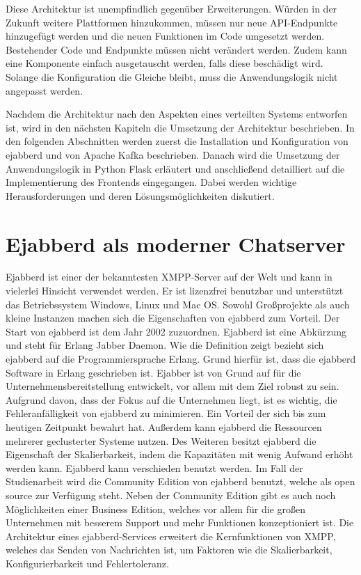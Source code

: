 \documentclass[a4paper,titlepage,halfparskip,12pt]{scrreprt}
\begin{document}
\begin{onehalfspacing}
Diese Architektur ist unempfindlich gegenüber Erweiterungen. Würden in der Zukunft weitere Plattformen hinzukommen, müssen nur neue \acs{API}-Endpunkte hinzugefügt werden und die neuen Funktionen im Code umgesetzt werden. Bestehender Code und Endpunkte müssen nicht verändert werden. Zudem kann eine Komponente einfach ausgetauscht werden, falls diese beschädigt wird. Solange die Konfiguration die Gleiche bleibt, muss die Anwendungslogik nicht angepasst werden.

Nachdem die Architektur nach den Aspekten eines verteilten Systems entworfen ist, wird in den nächsten Kapiteln die Umsetzung der Architektur beschrieben. In den folgenden Abschnitten werden zuerst die Installation und Konfiguration von ejabberd und von Apache Kafka beschrieben. Danach wird die Umsetzung der Anwendungslogik in Python Flask erläutert und anschließend detailliert auf die Implementierung des Frontends eingegangen. Dabei werden wichtige Herausforderungen und deren Lösungsmöglichkeiten diskutiert.

\pagebreak

\chapter{Ejabberd als moderner Chatserver}
\label{chap:ejabberd}

Ejabberd ist einer der bekanntesten \ac{XMPP}-Server auf der Welt und kann in vielerlei Hinsicht verwendet werden. Er ist lizenzfrei benutzbar und unterstützt das Betriebssystem Windows, Linux und Mac OS. Sowohl Großprojekte als auch kleine Instanzen machen sich die Eigenschaften von ejabberd zum Vorteil. Der Start von ejabberd ist dem Jahr 2002 zuzuordnen. Ejabberd ist eine Abkürzung und steht für \glqq Erlang Jabber Daemon\grqq. Wie die Definition zeigt bezieht sich ejabberd auf die Programmiersprache Erlang. Grund hierfür ist, dass die ejabberd Software in Erlang geschrieben ist. Ejabber ist von Grund auf für die Unternehmensbereitstellung entwickelt, vor allem mit dem Ziel robust zu sein. Aufgrund davon, dass der Fokus auf die Unternehmen liegt, ist es wichtig, die Fehleranfälligkeit von ejabberd zu minimieren. Ein Vorteil der sich bis zum heutigen Zeitpunkt bewahrt hat. Außerdem kann ejabberd die Ressourcen mehrerer geclusterter Systeme nutzen. Des Weiteren besitzt ejabberd die Eigenschaft der Skalierbarkeit, indem die Kapazitäten mit wenig Aufwand erhöht werden kann. Ejabberd kann verschieden benutzt werden. Im Fall der Studienarbeit wird die Community Edition von ejabberd benutzt, welche als open source zur Verfügung steht. Neben der Community Edition gibt es auch noch Möglichkeiten einer Business Edition, welches vor allem für die großen Unternehmen mit besserem Support und mehr Funktionen konzeptioniert ist. Die Architektur eines ejabberd-Services erweitert die Kernfunktionen von \ac{XMPP}, welches das Senden von Nachrichten ist, um Faktoren wie die Skalierbarkeit, Konfigurierbarkeit und Fehlertoleranz.


\end{onehalfspacing}
\end{document}
